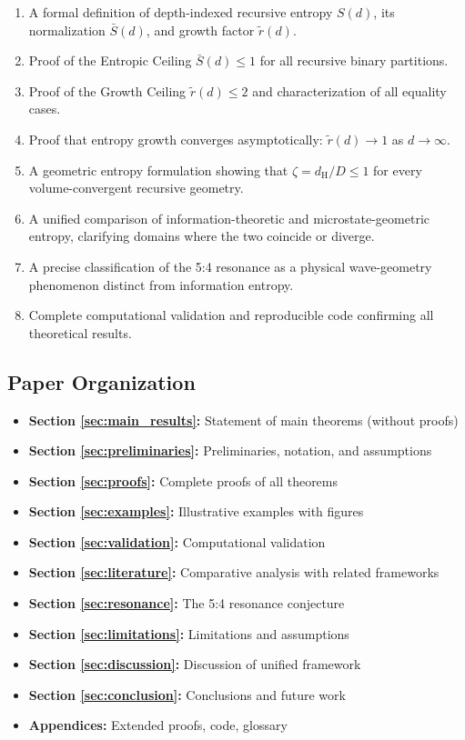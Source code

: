 \documentclass[11pt,a4paper]{article}
\theoremstyle{definition}
\theoremstyle{remark}
\newcommand{\dH}{d_{\mathrm{H}}}
\newcommand{\Sbar}{\bar{S}}
\newcommand{\rtilde}{\tilde{r}}
\begin{document}
\begin{enumerate}[label=(C\arabic*), leftmargin=*]
    \item A formal definition of depth-indexed recursive entropy $S(d)$, its 
          normalization $\Sbar(d)$, and growth factor $\rtilde(d)$.
    \item Proof of the Entropic Ceiling $\Sbar(d)\le 1$ for all recursive 
          binary partitions.
    \item Proof of the Growth Ceiling $\rtilde(d)\le 2$ and characterization 
          of all equality cases.
    \item Proof that entropy growth converges asymptotically:
          $\rtilde(d)\rightarrow 1$ as $d\rightarrow\infty$.
    \item A geometric entropy formulation showing that $\zeta = \dH/D \le 1$
          for every volume-convergent recursive geometry.
    \item A unified comparison of information-theoretic and microstate-geometric
          entropy, clarifying domains where the two coincide or diverge.
    \item A precise classification of the 5:4 resonance as a physical
          wave-geometry phenomenon distinct from information entropy.
    \item Complete computational validation and reproducible code confirming
          all theoretical results.
\end{enumerate}

\subsection{Paper Organization}

\begin{itemize}[nosep]
    \item \textbf{Section \ref{sec:main_results}:} Statement of main theorems (without proofs)
    \item \textbf{Section \ref{sec:preliminaries}:} Preliminaries, notation, and assumptions
    \item \textbf{Section \ref{sec:proofs}:} Complete proofs of all theorems
    \item \textbf{Section \ref{sec:examples}:} Illustrative examples with figures
    \item \textbf{Section \ref{sec:validation}:} Computational validation
    \item \textbf{Section \ref{sec:literature}:} Comparative analysis with related frameworks
    \item \textbf{Section \ref{sec:resonance}:} The 5:4 resonance conjecture
    \item \textbf{Section \ref{sec:limitations}:} Limitations and assumptions
    \item \textbf{Section \ref{sec:discussion}:} Discussion of unified framework
    \item \textbf{Section \ref{sec:conclusion}:} Conclusions and future work
    \item \textbf{Appendices:} Extended proofs, code, glossary
\end{itemize}
\end{document}
